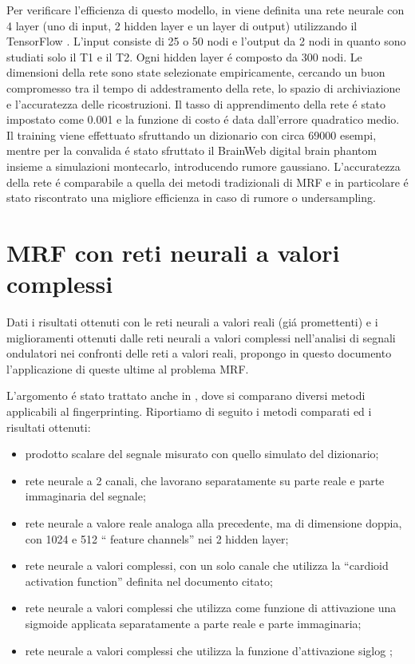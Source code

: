 \documentclass[a4paper,12pt]{report}
\begin{document}
 Per verificare l'efficienza di questo modello, in \cite{cohen2018mr} viene definita una rete neurale con 4 layer (uno di input, 2 hidden layer e un layer di output) utilizzando il TensorFlow \cite{abadi2016tensorflow}. L'input consiste di 25 o 50 nodi e l'output da 2 nodi in quanto sono studiati solo il T1 e il T2. Ogni hidden layer \'e composto da 300 nodi. Le dimensioni della rete sono state selezionate empiricamente, cercando un buon compromesso tra il tempo di addestramento della rete, lo spazio di archiviazione e l'accuratezza delle ricostruzioni. Il tasso di apprendimento della rete \'e stato impostato come 0.001 e la funzione di costo \'e data dall'errore quadratico medio. Il training viene effettuato sfruttando un dizionario con circa 69000 esempi, mentre per la convalida \'e stato sfruttato il BrainWeb digital brain phantom insieme a simulazioni montecarlo, introducendo rumore  gaussiano. L'accuratezza della rete \'e comparabile a quella dei metodi tradizionali di MRF e in particolare \'e stato riscontrato una migliore efficienza in caso di rumore o undersampling.
 
 
 
 \section{MRF con reti neurali a valori complessi}
 
 Dati i risultati ottenuti con le reti neurali a valori reali (gi\'a promettenti) e i miglioramenti ottenuti dalle reti neurali a valori complessi nell'analisi di segnali ondulatori nei confronti delle reti a valori reali, propongo in questo documento l'applicazione di queste ultime al problema MRF.
 
 L'argomento \'e stato trattato anche in \cite{virtue2017better}, dove si comparano diversi metodi applicabili al fingerprinting. Riportiamo di seguito i metodi comparati ed i risultati ottenuti:
 \begin{itemize}
  \item prodotto scalare del segnale misurato con quello simulato del dizionario;
  \item rete neurale a 2 canali, che lavorano separatamente su parte reale e parte immaginaria del segnale;
  \item rete neurale a valore reale analoga alla precedente, ma di dimensione doppia, con 1024 e 512 `` feature channels'' nei 2 hidden layer;
  \item rete neurale a valori complessi, con un solo canale che utilizza la ``cardioid activation function'' definita nel documento citato;
  \item rete neurale a valori complessi che utilizza come funzione di attivazione una sigmoide applicata separatamente a parte reale e parte immaginaria;
  \item rete neurale a valori complessi che utilizza la funzione d'attivazione siglog \cite{georgiou1992complex};
 \end{itemize}
\end{document}
